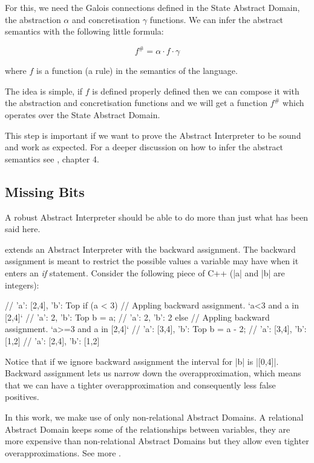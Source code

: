 For this, we need the Galois connections defined in the State Abstract
Domain, the abstraction \(\alpha\) and concretisation \(\gamma\)
functions. We can infer the abstract semantics with the following little
formula:

\[f^\# = \alpha \cdot f \cdot \gamma\]

where \(f\) is a function (a rule) in the semantics of the language.

The idea is simple, if \(f\) is defined properly defined then we can
compose it with the abstraction and concretisation functions and we will
get a function \(f^\#\) which operates over the State Abstract Domain.

This step is important if we want to prove the Abstract Interpreter to
be sound and work as expected. For a deeper discussion on how to infer
the abstract semantics see \textcite{nielson2015principles}, chapter 4.

\subsection{Missing Bits}\label{missing-bits}

A robust Abstract Interpreter should be able to do more than just what
has been said here.

\textcite{mine_weakly_2004} extends an Abstract Interpreter with the
backward assignment. The backward assignment is meant to restrict the
possible values a variable may have when it enters an \emph{if}
statement. Consider the following piece of C++ (\pycode|a| and
\pycode|b| are integers):

\begin{pythoncode}
// {'a': [2,4], 'b': Top}
if (a < 3) {
  // Appling backward assignment. `a<3 and a in [2,4]`
  // {'a': 2, 'b': Top}
  b = a;
  // {'a': 2, 'b': 2}
} else {
  // Appling backward assignment. `a>=3 and a in [2,4]`
  // {'a': [3,4], 'b': Top}
  b = a - 2;
  // {'a': [3,4], 'b': [1,2]}
}
// {'a': [2,4], 'b': [1,2]}
\end{pythoncode}

Notice that if we ignore backward assignment the interval for \pycode|b|
is \pycode|[0,4]|. Backward assignment lets us narrow down the
overapproximation, which means that we can have a tighter
overapproximation and consequently less false positives.

In this work, we make use of only non-relational Abstract Domains. A
relational Abstract Domain keeps some of the relationships between
variables, they are more expensive than non-relational Abstract Domains
but they allow even tighter overapproximations. See more
\textcite{mine_weakly_2004}.
